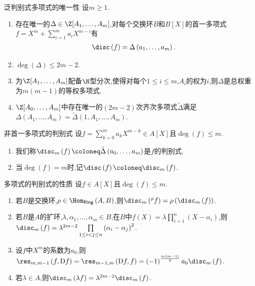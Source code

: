 \begin{proposition}{泛判别式多项式的唯一性}{}
	设$m\geq 1$.
	\begin{enumerate}
		\item 存在唯一的$\Delta\in\Z[A_{1},\ldots,A_{m}]$,对每个交换环$B$和$B[X]$的首一多项式$f=X^{m}+\sum\limits_{i=1}^{m}a_{i}X^{m-i}$有
		\begin{align*}
			\disc\left(f\right)=\Delta\left(a_{1},\ldots,a_{m}\right).
		\end{align*}
		\item $\deg\left(\Delta\right)\leq 2m-2$.
		\item 为$\Z[A_{1},\ldots,A_{m}]$配备$\N$型分次,使得对每个$1\leq i\leq m$,$A_{i}$的权为$i$,则$\Delta$是总权重为$m\left(m-1\right)$的等权多项式.
		\item $\Z[A_{0},\ldots,A_{m}]$中存在唯一的$\left(2m-2\right)$次齐次多项式$\tilde{\Delta}$满足$\Delta\left(A_{1},\ldots,A_{m}\right)=\tilde{\Delta}\left(1,A_{1},\ldots,A_{m}\right)$.
	\end{enumerate}
\end{proposition}

\begin{definition}{非首一多项式的判别式}{}
	设$f=\sum\limits_{k=0}^{m}a_{k}X^{m-k}\in A[X]$且$\deg\left(f\right)\leq m$.
	\begin{enumerate}
		\item 我们称$\disc_{m}\left(f\right)\coloneq\tilde{\Delta}\left(a_{0},\ldots,a_{m}\right)$是$f$的判别式.
		\item 当$\deg\left(f\right)=m$时,记$\disc\left(f\right)\coloneq\disc_{m}\left(f\right)$.
	\end{enumerate}
\end{definition}

\begin{proposition}{多项式的判别式的性质}{}
	设$f\in A[X]$且$\deg\left(f\right)\leq m$.
	\begin{enumerate}
		\item 若$B$是交换环,$\rho\in\Hom_{\mathsf{Ring}}\left(A,B\right)$,则$\disc_{m}\left(^{\rho}f\right)=\rho\left(\disc_{m}\left(f\right)\right)$.
		\item 若$B$是$A$的扩环,$\lambda,\alpha_{1},\ldots,\alpha_{m}\in B$,在$B$中$f\left(X\right)=\lambda\prod\limits_{i=1}^{n}\left(X-\alpha_{i}\right)$,则$\disc_{m}\left(f\right)=\lambda^{2m-2}\prod\limits_{1\leq i<j\leq n}\left(\alpha_{i}-\alpha_{j}\right)^{2}$.
		\item 设$f$中$X^{m}$的系数为$a_{0}$,则$\res_{m,m-1}\left(f,\mathrm{D}f\right)=\res_{m-1,m}\left(\mathrm{D}f,f\right)=\left(-1\right)^{\frac{m\left(m-1\right)}{2}}a_{0}\disc_{m}\left(f\right)$.
		\item 若$\lambda\in A$,则$\disc_{m}\left(\lambda f\right)=\lambda^{2m-2}\disc_{m}\left(f\right)$.
	\end{enumerate}
\end{proposition}

